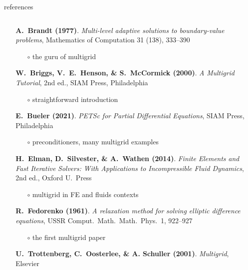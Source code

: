 \documentclass[10pt,
               svgnames,
               hyperref={colorlinks,citecolor=DeepPink4,linkcolor=FireBrick,urlcolor=Maroon},
               usepdftitle=false]{beamer}
\begin{document}
\begin{frame}{references}


\begin{columns}
\begin{column}{0.8\textwidth}
\begin{itemize}
\item[] \textbf{A.~Brandt (1977)}. \emph{Multi-level adaptive solutions to boundary-value problems}, Mathematics of Computation 31 (138), 333--390
    \begin{itemize}
    \item[$\circ$] the guru of multigrid
    \end{itemize}
\item[] \textbf{W.~Briggs, V.~E.~Henson, \& S.~McCormick (2000)}.  \emph{A Multigrid Tutorial}, 2nd ed., SIAM Press, Philadelphia
    \begin{itemize}
    \item[$\circ$] straightforward introduction
    \end{itemize}
\item[] \textbf{E.~Bueler (2021)}. \emph{PETSc for Partial Differential Equations}, SIAM Press, Philadelphia
    \begin{itemize}
    \item[$\circ$] preconditioners, many multigrid examples
    \end{itemize}
\item[] \textbf{H.~Elman, D.~Silvester, \& A.~Wathen (2014)}. \emph{Finite Elements and Fast Iterative Solvers: With Applications to Incompressible Fluid Dynamics}, 2nd ed., Oxford U.~Press
    \begin{itemize}
    \item[$\circ$] multigrid in FE and fluids contexts
    \end{itemize}
\item[] \textbf{R.~Fedorenko (1961)}.  \emph{A relaxation method for solving elliptic difference equations}, USSR Comput.~Math.~Math.~Phys.~1, 922--927
    \begin{itemize}
    \item[$\circ$] the first multigrid paper
    \end{itemize}
\item[] \textbf{U.~Trottenberg, C.~Oosterlee, \& A. Schuller (2001)}.  \emph{Multigrid}, Elsevier
    \begin{itemize}

\end{itemize}
\end{itemize}
\end{column}
\end{columns}
\end{frame}
\end{document}
